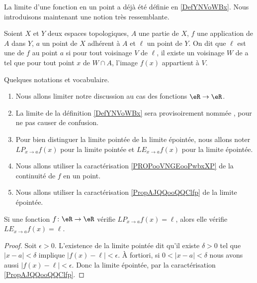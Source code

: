 La limite d'une fonction en un point a déjà été définie en \ref{DefYNVoWBx}. Nous introduisons maintenant une notion très ressemblante.

\begin{definition}     \label{DEFooBAPHooUtIaRS}
	Soient \( X\) et \( Y\) deux espaces topologiques, \( A\) une partie de \( X\), \( f\) une application de \( A\) dans \( Y\), \( a\) un point de \( X\) adhérent à \( A\) et \(\ell \) un point de \( Y\). On dit que \( \ell\) est une  de \( f\) au point \( a\) si pour tout voisinage \( V\) de \( \ell\), il existe un voisinage \( W\) de a tel que pour tout point \( x\) de \( W\cap A\), l'image \( f(x)\) appartient à \( V\).
\end{definition}

Quelques notations et vocabulaire.
\begin{enumerate}
	\item
	      Nous allons limiter notre discussion au cas des fonctions \( \eR\to \eR\).
	\item
	      La limite de la définition \ref{DefYNVoWBx} sera provisoirement nommée , pour ne pas causer de confusion.
	\item
	      Pour bien distinguer la limite pointée de la limite épointée, nous allons noter \( {LP}_{x\to a}f(x)\) pour la limite pointée et \( {LE}_{x\to a}f(x)\) pour la limite épointée.
	\item
	      Nous allons utiliser la caractérisation \ref{PROPooVNGEooPwbxXP} de la continuité de \( f\) en un point.
	\item
	      Nous allons utiliser la caractérisation \ref{PropAJQQooQQClfp} de la limite épointée.
\end{enumerate}

\begin{lemma}       \label{LEMooWAZLooDPvemu}
	Si une fonction \( f\colon \eR\to \eR\) vérifie \( {LP}_{x\to a} f(x)=\ell\), alors elle vérifie \( {LE}_{x\to a}f(x)=\ell\).
\end{lemma}

\begin{proof}
	Soit \( \epsilon>0\). L'existence de la limite pointée dit qu'il existe \( \delta>0\) tel que \( | x-a |<\delta\) implique \( | f(x)-\ell |<\epsilon\). À fortiori, si \( 0<| x-a |<\delta\) nous avons aussi \( | f(x)-\ell |<\epsilon\). Donc la limite épointée, par la caractérisation \ref{PropAJQQooQQClfp}.
\end{proof}

